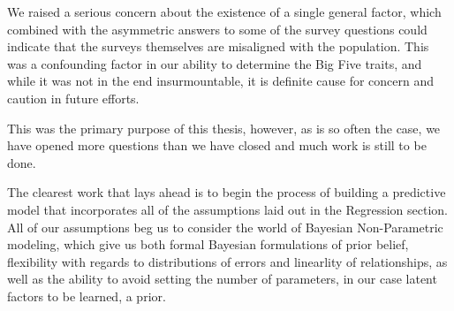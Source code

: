 \documentclass[a4paper,12pt]{article}
\begin{document}
We raised a serious concern about the existence of a single general factor, which combined with the asymmetric answers to some of the survey questions could indicate that the surveys themselves are misaligned with the population. This was a confounding factor in our ability to determine the Big Five traits, and while it was not in the end insurmountable, it is definite cause for concern and caution in future efforts.

This was the primary purpose of this thesis, however, as is so often the case, we have opened more questions than we have closed and much work is still to be done.

The clearest work that lays ahead is to begin the process of building a predictive model that incorporates all of the assumptions laid out in the Regression section. All of our assumptions beg us to consider the world of Bayesian Non-Parametric modeling, which give us both formal Bayesian formulations of prior belief, flexibility with regards to distributions of errors and linearlity of relationships, as well as the ability to avoid setting the number of parameters, in our case latent factors to be learned, a prior.

\printbibliography
\end{document}
